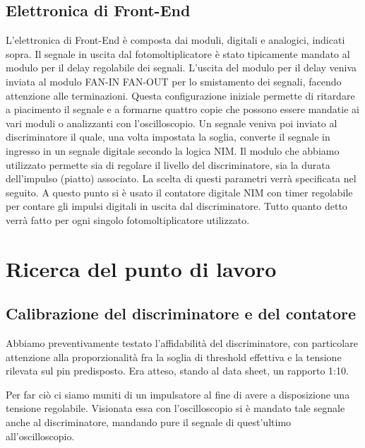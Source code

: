 \documentclass[a4paper,10pt]{article}
\begin{document}
\subsection{Elettronica di Front-End}
L'elettronica di Front-End è composta dai moduli, digitali e analogici, indicati sopra. Il segnale in uscita dal fotomoltiplicatore è stato tipicamente mandato al modulo per il delay regolabile dei segnali. L'uscita del modulo per il delay veniva inviata al modulo FAN-IN FAN-OUT per lo smistamento dei segnali, facendo attenzione alle terminazioni. Questa configurazione iniziale permette di ritardare a piacimento il segnale e a formarne quattro copie che possono essere mandatie ai vari moduli o analizzanti con l'oscilloscopio. Un segnale veniva poi inviato al discriminatore il quale, una volta impostata la soglia, converte il segnale in ingresso in un segnale digitale secondo la logica NIM. Il modulo che abbiamo utilizzato permette sia di regolare il livello del discriminatore, sia la durata dell'impulso (piatto) associato. La scelta di questi parametri verrà specificata nel seguito. A questo punto si è usato il contatore digitale NIM con timer regolabile per contare gli impulsi digitali in uscita dal discriminatore. Tutto quanto detto verrà fatto per ogni singolo fotomoltiplicatore utilizzato. 








\section{Ricerca del punto di lavoro}
\label{sec:puntodilavoro} 
\subsection{Calibrazione del discriminatore e del contatore}
Abbiamo preventivamente testato l'affidabilità del discriminatore, con particolare attenzione alla proporzionalità fra la soglia di threshold effettiva e la tensione rilevata sul pin predisposto. Era atteso, stando al data sheet, un rapporto 1:10.

Per far ciò ci siamo muniti di un impulsatore al fine di avere a disposizione una tensione regolabile. Visionata essa con l'oscilloscopio si è mandato tale segnale anche al discriminatore, mandando pure il segnale di quest'ultimo all'oscilloscopio.
\end{document}
